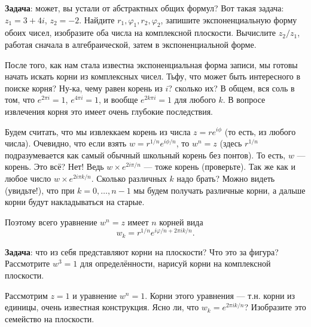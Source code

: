 \documentclass[12pt]{article}
\begin{document}
{\bf Задача}: может, вы устали от абстрактных общих формул? Вот такая задача: $z_1 = 3 + 4i$, $z_2 = -2$. Найдите $r_1, \varphi_1, r_2, \varphi_2$, запишите экспоненциальную форму обоих чисел, изобразите оба числа на комплексной плоскости. Вычислите $z_2 / z_1$, работая сначала в алгебраической, затем в экспоненциальной форме.

После того, как нам стала известна экспоненциальная форма записи, мы готовы начать искать корни из комплексных чисел. Тьфу, что может быть интересного в поиске корня? Ну-ка, чему равен корень из $i$? сколько их? В общем, вся соль в том, что $e^{2 \pi i} = 1$, $e^{4 \pi i} = 1$, и вообще $e^{2 k \pi i} = 1$ для любого $k$. В вопросе извлечения корня это имеет очень глубокие последствия. 

Будем считать, что мы извлеккаем корень из числа $z = r e^{i \phi}$ (то есть, из любого числа). Очевидно, что если взять $w = r^{1/n} e^{i \phi / n}$, то $w^n = z$ (здесь $r^{1/n}$ подразумевается как самый обычный школьный корень без понтов). То есть, $w$ --- корень. Это всё? Нет! Ведь $w \times e^{2 i \pi / n}$ --- тоже корень (проверьте). Так же как и любое число $w \times e^{2 i \pi k / n}$. Сколько различных $k$ надо брать? Можно видеть (увидьте!), что при $k = 0, \ldots, n - 1$ мы будем получать различные корни, а дальше корни будут накладываться на старые.

Поэтому всего уравнение $w^n = z$ имеет $n$ корней вида $$w_k = r^{1/n} e^{i \varphi / n + 2 \pi i k / n}.$$

{\bf Задача}: что из себя представляют корни на плоскости? Что это за фигура? Рассмотрите $w^3 = 1$ для определённости, нарисуй корни на комплексной плоскости.

Рассмотрим $z = 1$ и уравнение $w^n = 1$. Корни этого уравнения --- т.н. корни из единицы, очень известная конструкция. Ясно ли, что $w_k = e^{2 \pi i k / n}$? Изобразите это семейство на плоскости.
\end{document}
